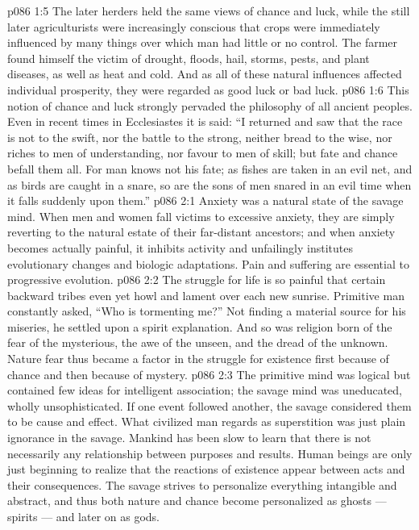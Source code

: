 \vs p086 1:5 The later herders held the same views of chance and luck, while the still later agriculturists were increasingly conscious that crops were immediately influenced by many things over which man had little or no control. The farmer found himself the victim of drought, floods, hail, storms, pests, and plant diseases, as well as heat and cold. And as all of these natural influences affected individual prosperity, they were regarded as good luck or bad luck.
\vs p086 1:6 This notion of chance and luck strongly pervaded the philosophy of all ancient peoples. Even in recent times in Ecclesiastes it is said: “I returned and saw that the race is not to the swift, nor the battle to the strong, neither bread to the wise, nor riches to men of understanding, nor favour to men of skill; but fate and chance befall them all. For man knows not his fate; as fishes are taken in an evil net, and as birds are caught in a snare, so are the sons of men snared in an evil time when it falls suddenly upon them.”
\vs p086 2:1 Anxiety was a natural state of the savage mind. When men and women fall victims to excessive anxiety, they are simply reverting to the natural estate of their far\hyp{}distant ancestors; and when anxiety becomes actually painful, it inhibits activity and unfailingly institutes evolutionary changes and biologic adaptations. Pain and suffering are essential to progressive evolution.
\vs p086 2:2 The struggle for life is so painful that certain backward tribes even yet howl and lament over each new sunrise. Primitive man constantly asked, “Who is tormenting me?” Not finding a material source for his miseries, he settled upon a spirit explanation. And so was religion born of the fear of the mysterious, the awe of the unseen, and the dread of the unknown. Nature fear thus became a factor in the struggle for existence first because of chance and then because of mystery.
\vs p086 2:3 \pc The primitive mind was logical but contained few ideas for intelligent association; the savage mind was uneducated, wholly unsophisticated. If one event followed another, the savage considered them to be cause and effect. What civilized man regards as superstition was just plain ignorance in the savage. Mankind has been slow to learn that there is not necessarily any relationship between purposes and results. Human beings are only just beginning to realize that the reactions of existence appear between acts and their consequences. The savage strives to personalize everything intangible and abstract, and thus both nature and chance become personalized as ghosts --- spirits --- and later on as gods.
